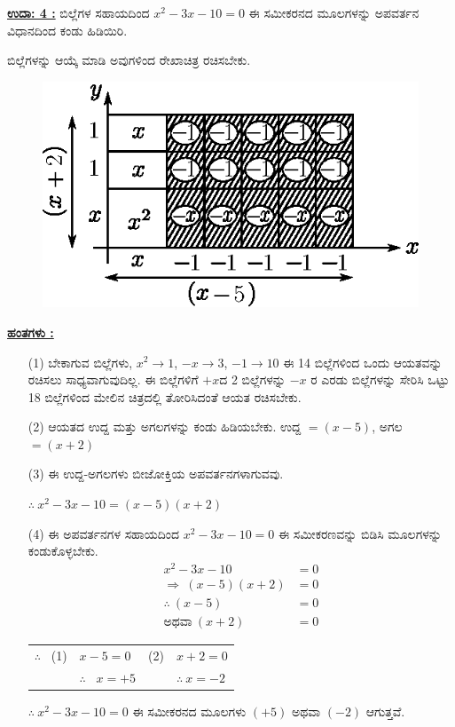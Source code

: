 \noindent
{\textbf{\underline{ಉದಾ: 4 :}}} ಬಿಲ್ಲೆಗಳ ಸಹಾಯದಿಂದ $x^2 - 3x - 10 = 0$ ಈ ಸಮೀಕರನದ ಮೂಲ\break ಗಳನ್ನು ಅಪವರ್ತನ ವಿಧಾನದಿಂದ ಕಂಡು ಹಿಡಿಯಿರಿ. 

ಬಿಲ್ಲೆಗಳನ್ನು ಆಯ್ಕೆ ಮಾಡಿ ಅವುಗಳಿಂದ ರೇಖಾಚಿತ್ರ  ರಚಿಸಬೇಕು.
\begin{figure}[H]
\centering
\includegraphics[scale=0.8]{src/figure/chap3/fig3-54b.eps}
\end{figure}
\noindent
{\textbf{\underline{ಹಂತಗಳು :}}}
\begin{itemize}
\item [(1)] ಬೇಕಾಗುವ ಬಿಲ್ಲೆಗಳು, $x^2 \rightarrow 1$, $-x \rightarrow 3$, $-1 \rightarrow 10$ ಈ 14 ಬಿಲ್ಲೆ\break ಗಳಿಂದ ಒಂದು ಆಯತವನ್ನು ರಚಿಸಲು ಸಾಧ್ಯವಾಗುವುದಿಲ್ಲ. ಈ ಬಿಲ್ಲೆಗಳಿಗೆ $+x$ದ 2 ಬಿಲ್ಲೆಗಳನ್ನು  $-x$ ರ ಎರಡು ಬಿಲ್ಲೆಗಳನ್ನು  ಸೇರಿಸಿ ಒಟ್ಟು 18 ಬಿಲ್ಲೆಗಳಿಂದ ಮೇಲಿನ ಚಿತ್ರದಲ್ಲಿ ತೋರಿಸಿದಂತೆ ಆಯತ ರಚಿಸಬೇಕು. 
\item [(2)] ಆಯತದ ಉದ್ದ ಮತ್ತು ಅಗಲಗಳನ್ನು ಕಂಡು ಹಿಡಿಯಬೇಕು. ಉದ್ದ $= (x - 5)$, ಅಗಲ $= (x + 2)$
\item [(3)] ಈ ಉದ್ದ-ಅಗಲಗಳು ಬೀಜೋಕ್ತಿಯ ಅಪವರ್ತನಗಳಾಗುವವು. 

$\therefore~ x^2 - 3x - 10 = (x-5)(x+2)$
\item [(4)] ಈ ಅಪವರ್ತನಗಳ ಸಹಾಯದಿಂದ $x^2 - 3x - 10 = 0$ ಈ ಸಮೀಕರಣವನ್ನು ಬಿಡಿಸಿ ಮೂಲಗಳನ್ನು ಕಂಡುಕೊಳ್ಳಬೇಕು. 
\begin{align*}
x^2 - 3x - 10 & = 0\\
\Rightarrow~ (x-5)(x+2) & = 0\\
\therefore~ (x-5) & = 0\tag{1}\\
\text{ಅಥವಾ}~ (x+2) & = 0\tag{2}
\end{align*}

\begin{tabular}{llll}
$\therefore$~ (1) & $x - 5 = 0$ & (2) & $x + 2 = 0$\\
& $\therefore$~ $x = +5$ & &$\therefore~ x = -2$
\end{tabular}

$\therefore~ x^2 - 3x - 10 = 0$ ಈ ಸಮೀಕರನದ ಮೂಲಗಳು $(+5)$ ಅಥವಾ $(-2)$ ಆಗುತ್ತವೆ. 
\end{itemize}

